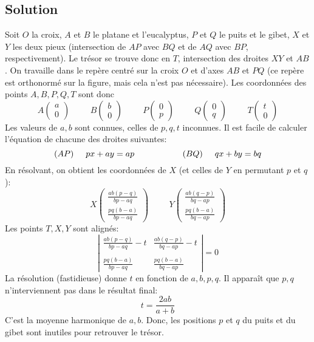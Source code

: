 \documentclass{article}
\newcommand{\hascoord}[2]{\left(\begin{array}{c}{#1}\\{#2}\end{array}\right)}
\newenvironment{solution}{\subsection{Solution}}{\pagebreak}
\begin{document}
\begin{solution}
\begin{center}
\end{center}
Soit $O$ la croix, $A$ et $B$ le platane et l'eucalyptus, $P$ et $Q$ le puits et le gibet, $X$ et $Y$ les deux pieux (intersection de $AP$ avec $BQ$ et de $AQ$ avec $BP$, respectivement). Le trésor se trouve donc en $T$, intersection des droites $XY$ et $AB$. On travaille dans le repère centré sur la croix $O$ et d'axes $AB$ et $PQ$ (ce repère est orthonormé sur la figure, mais cela n'est pas nécessaire). Les coordonnées des points $A,B,P,Q,T$ sont donc
\[
A\hascoord{a}{0}\hspace{1cm}B\hascoord{b}{0}
\hspace{1cm}
P\hascoord{0}{p}\hspace{1cm}Q\hascoord{0}{q}
\hspace{1cm}
T\hascoord{t}{0}
\]
Les valeurs de $a,b$ sont connues, celles de $p,q,t$ inconnues. Il est facile de calculer l'équation de chacune des droites suivantes:
\[
(AP)\hspace{.5cm}px+ay = ap
\hspace{2cm}
(BQ)\hspace{.5cm}qx+by = bq
\]
En résolvant, on obtient les coordonnées de $X$ (et celles de $Y$ en permutant $p$ et $q$):
\[
X\hascoord{\frac{ab(p-q)}{bp-aq}}{\frac{pq(b-a)}{bp-aq}}
\hspace{1cm}
Y\hascoord{\frac{ab(q-p)}{bq-ap}}{\frac{pq(b-a)}{bq-ap}}
\]
Les points $T,X,Y$ sont alignés:
\[
\left|
\begin{array}{cc}
\frac{ab(p-q)}{bp-aq}-t & \frac{ab(q-p)}{bq-ap}-t\\ \\
\frac{pq(b-a)}{bp-aq} & \frac{pq(b-a)}{bq-ap}
\end{array}
\right| = 0
\]
La résolution (fastidieuse) donne $t$ en fonction de $a,b,p,q$. Il apparaît que $p,q$ n'interviennent pas dans le résultat final:
\[
t=\frac{2ab}{a+b}
\]
C'est la moyenne harmonique de $a,b$. Donc, les positions $p$ et $q$ du puits et du gibet sont inutiles pour retrouver le trésor.
\end{solution}
\end{document}
